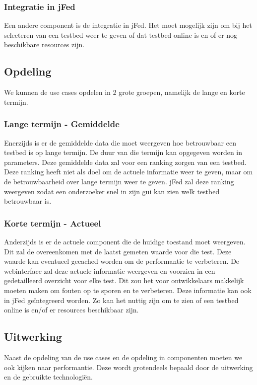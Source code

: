 \documentclass[11pt]{article}
\begin{document}
\subsubsection{Integratie in jFed}
Een andere component is de integratie in jFed. Het moet mogelijk zijn om bij het selecteren van een testbed weer te geven of dat testbed online is en of er nog beschikbare resources zijn.

\subsection{Opdeling}
We kunnen de use cases opdelen in 2 grote groepen, namelijk de lange en korte termijn.
\subsubsection{Lange termijn - Gemiddelde}
Enerzijds is er de gemiddelde data die moet weergeven hoe betrouwbaar een testbed is op lange termijn. De duur van die termijn kan opgegeven worden in parameters. Deze gemiddelde data zal voor een ranking zorgen van een testbed. Deze ranking heeft niet als doel om de actuele informatie weer te geven, maar om de betrouwbaarheid over lange termijn weer te geven. jFed zal deze ranking weergeven zodat een onderzoeker snel in zijn gui kan zien welk testbed betrouwbaar is.
\subsubsection{Korte termijn - Actueel}
Anderzijds is er de actuele component die de huidige toestand moet weergeven. Dit zal de overeenkomen met de laatst gemeten waarde voor die test. Deze waarde kan eventueel gecached worden om de performantie te verbeteren. De webinterface zal deze actuele informatie weergeven en voorzien in een gedetailleerd overzicht voor elke test. Dit zou het voor ontwikkelaars makkelijk moeten maken om fouten op te sporen en te verbeteren. Deze informatie kan ook in jFed ge\"{i}ntegreerd worden. Zo kan het nuttig zijn om te zien of een testbed online is en/of er resources beschikbaar zijn.

\subsection{Uitwerking}
Naast de opdeling van de use cases en de opdeling in componenten moeten we ook kijken naar performantie. Deze wordt grotendeels bepaald door de uitwerking en de gebruikte technologi\"{e}n.
\end{document}
